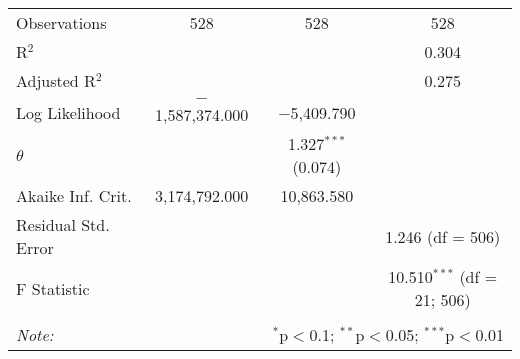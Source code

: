\begin{table}[!htbp]
\begin{tabular}{@{\extracolsep{5pt}}lccc}
Observations & 528 & 528 & 528 \\ 
R$^{2}$ &  &  & 0.304 \\ 
Adjusted R$^{2}$ &  &  & 0.275 \\ 
Log Likelihood & $-$1,587,374.000 & $-$5,409.790 &  \\ 
$\theta$ &  & 1.327$^{***}$  (0.074) &  \\ 
Akaike Inf. Crit. & 3,174,792.000 & 10,863.580 &  \\ 
Residual Std. Error &  &  & 1.246 (df = 506) \\ 
F Statistic &  &  & 10.510$^{***}$ (df = 21; 506) \\ 
\hline 
\hline \\[-1.8ex] 
\textit{Note:}  & \multicolumn{3}{r}{$^{*}$p$<$0.1; $^{**}$p$<$0.05; $^{***}$p$<$0.01} \\ 
\end{tabular} 
\end{table} 
